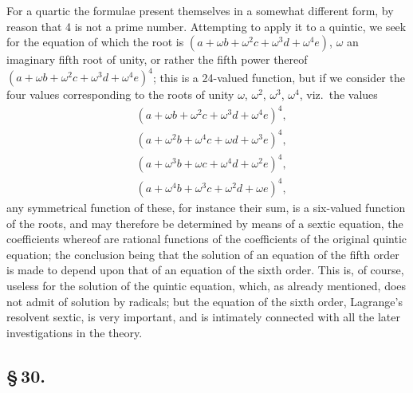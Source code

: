 \documentclass[11pt,a4paper]{book}
\begin{document}
For a quartic the formulae present themselves in a somewhat different form, by reason that 4 is not a prime number. Attempting to apply it to a quintic, we seek for the equation of which the root is $(a + \omega b + \omega^{2}c + \omega^{3}d + \omega^{4}e)$, $\omega$ an imaginary fifth root of unity, or rather the fifth power thereof $(a + \omega b + \omega^{2}c + \omega^{3}d + \omega^{4}e)^{4}$; this is a 24-valued function, but if we consider the four values corresponding to the roots of unity $\omega$, $\omega^{2}$, $\omega^{3}$, $\omega^{4}$, viz.\ the values
\begin{align*}
&(a + \omega b + \omega^{2}c + \omega^{3}d + \omega^{4}e)^{4}, \\
&(a + \omega^{2}b + \omega^{4}c + \omega d + \omega^{3}e)^{4}, \\
&(a + \omega^{3}b + \omega c + \omega^{4}d + \omega^{2}e)^{4}, \\
&(a + \omega^{4}b + \omega^{3}c + \omega^{2}d + \omega e)^{4},
\end{align*}
any symmetrical function of these, for instance their sum, is a six-valued function of the roots, and may therefore be determined by means of a sextic equation, the coefficients whereof are rational functions of the coefficients of the original quintic equation; the conclusion being that the solution of an equation of the fifth order is made to depend upon that of an equation of the sixth order. This is, of course, useless for the solution of the quintic equation, which, as already mentioned, does not admit of solution by radicals; but the equation of the sixth order, Lagrange's resolvent sextic, is very important, and is intimately connected with all the later investigations in the theory.

\subsection*{\S\,30.}
\end{document}

